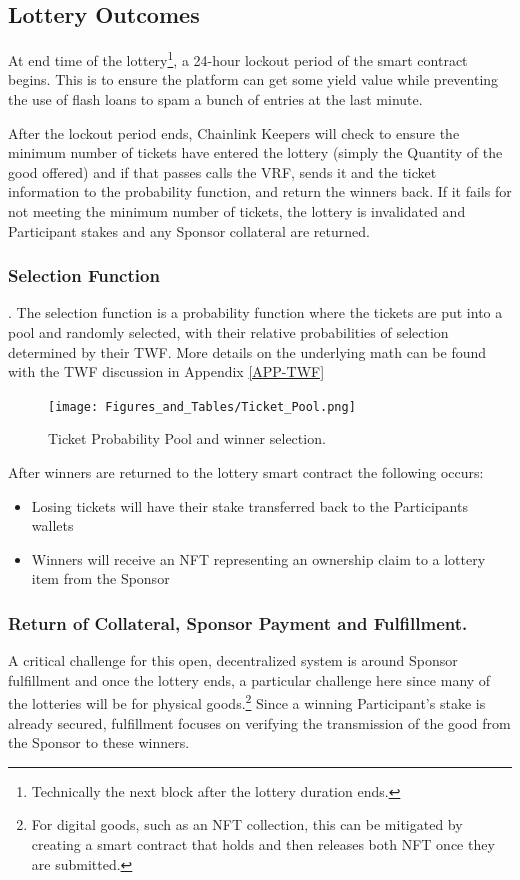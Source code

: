 \documentclass[runningheads]{llncs}
\begin{document}
\subsection{Lottery Outcomes}\label{subsection-LotteryOutcomes}
At end time of the lottery\footnote{Technically the next block after the lottery duration ends.},  a 24-hour lockout period of the smart contract begins.  This is to ensure the platform can get some yield value while preventing the use of flash loans to spam a bunch of entries at the last minute. 

After the lockout period ends, Chainlink Keepers will check to ensure the minimum number of tickets have entered the lottery (simply the Quantity of the good offered) and if that passes calls the VRF, sends it and the ticket information to the probability function, and return the winners back.  If it fails for not meeting the minimum number of tickets, the lottery is invalidated and Participant stakes and any Sponsor collateral are returned.  

\subsubsection{Selection Function}.  The selection function is a probability function where the tickets are put into a pool and randomly selected, with their relative probabilities of selection determined by their TWF.  More details on the underlying math can be found with the TWF discussion in Appendix \ref{APP-TWF}

\begin{figure}[H]
\centering
\texttt{[image: Figures\_and\_Tables/Ticket\_Pool.png]}
\caption{Ticket Probability Pool and winner selection.}
\end{figure}

\noindent After winners are returned to the lottery smart contract the following occurs:
\begin{itemize}
\item Losing tickets will have their stake transferred back to the Participants wallets
\item Winners will receive an NFT representing an ownership claim to a lottery item from the Sponsor
\end{itemize}

\subsubsection{Return of Collateral, Sponsor Payment and Fulfillment.}  A critical challenge for this open, decentralized system is around Sponsor fulfillment and once the lottery ends, a particular challenge here since many of the lotteries will be for physical goods.\footnote{For digital goods, such as an NFT collection, this can be mitigated by creating a smart contract that holds and then releases both NFT once they are submitted.}   Since a winning Participant’s stake is already secured, fulfillment focuses on verifying the transmission of the good from the Sponsor to these winners.
\end{document}
